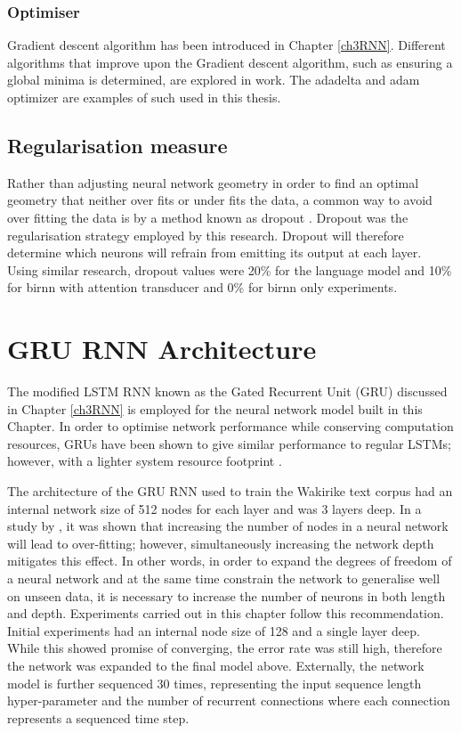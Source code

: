 \subsubsection{Optimiser}
Gradient descent algorithm has been introduced in Chapter \ref{ch3RNN}.  Different algorithms that improve upon the Gradient descent algorithm, such as ensuring a global minima is determined, are explored in work.  The adadelta and adam optimizer are examples of such used in this thesis.

\subsection{Regularisation measure}
Rather than adjusting neural network geometry in order to find an optimal geometry that neither over fits or under fits the data, a common way to avoid over fitting the data is by a method known as dropout \citep{srivastava2014dropout}.  Dropout was the regularisation strategy employed by this research.  Dropout will therefore determine which neurons will refrain from emitting its output at each layer. Using similar research, dropout values were 20\% for the language model and 10\% for \acrshort{birnn} with attention transducer and 0\% for \acrshort{birnn} only experiments.

\section{GRU RNN Architecture}
The modified LSTM RNN known as the Gated Recurrent Unit (GRU) discussed in Chapter \ref{ch3RNN} is employed for the neural network model built in this Chapter.  In order to optimise network performance while conserving computation resources, GRUs have been shown to give similar performance to regular LSTMs; however, with a lighter system resource footprint \citep{cho2014learning}. 

The architecture of the GRU RNN used to train the Wakirike text corpus had an internal network size of 512 nodes for each layer and was 3 layers deep. In a study by \citep{goodfellow2013multi}, it was shown that increasing the number of nodes in a neural network will lead to over-fitting; however, simultaneously increasing the network depth mitigates this effect.  In other words, in order to expand the degrees of freedom of a neural network and at the same time constrain the network to generalise well on unseen data, it is necessary to increase the number of neurons in both length and depth.  Experiments carried out in this chapter follow this recommendation. Initial experiments had an internal node size of 128 and a single layer deep.  While this showed promise of converging, the error rate was still high, therefore the network was expanded to the final model above.   Externally, the network model is further  sequenced 30 times, representing the input sequence length hyper-parameter and the number of recurrent connections where each connection represents a sequenced time step. 

